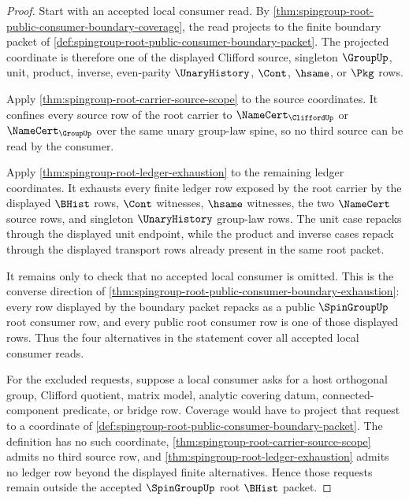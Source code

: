 \begin{proof}
Start with an accepted local consumer read. By \autoref{thm:spingroup-root-public-consumer-boundary-coverage}, the read projects to the finite boundary packet of \autoref{def:spingroup-root-public-consumer-boundary-packet}. The projected coordinate is therefore one of the displayed Clifford source, singleton $\GroupUp$, unit, product, inverse, even-parity $\UnaryHistory$, $\Cont$, $\hsame$, or $\Pkg$ rows.

Apply \autoref{thm:spingroup-root-carrier-source-scope} to the source coordinates. It confines every source row of the root carrier to $\NameCert_{\CliffordUp}$ or $\NameCert_{\GroupUp}$ over the same unary group-law spine, so no third source can be read by the consumer.

Apply \autoref{thm:spingroup-root-ledger-exhaustion} to the remaining ledger coordinates. It exhausts every finite ledger row exposed by the root carrier by the displayed $\BHist$ rows, $\Cont$ witnesses, $\hsame$ witnesses, the two $\NameCert$ source rows, and singleton $\UnaryHistory$ group-law rows. The unit case repacks through the displayed unit endpoint, while the product and inverse cases repack through the displayed transport rows already present in the same root packet.

It remains only to check that no accepted local consumer is omitted. This is the converse direction of \autoref{thm:spingroup-root-public-consumer-boundary-exhaustion}: every row displayed by the boundary packet repacks as a public $\SpinGroupUp$ root consumer row, and every public root consumer row is one of those displayed rows. Thus the four alternatives in the statement cover all accepted local consumer reads.

For the excluded requests, suppose a local consumer asks for a host orthogonal group, Clifford quotient, matrix model, analytic covering datum, connected-component predicate, or bridge row. Coverage would have to project that request to a coordinate of \autoref{def:spingroup-root-public-consumer-boundary-packet}. The definition has no such coordinate, \autoref{thm:spingroup-root-carrier-source-scope} admits no third source row, and \autoref{thm:spingroup-root-ledger-exhaustion} admits no ledger row beyond the displayed finite alternatives. Hence those requests remain outside the accepted $\SpinGroupUp$ root $\BHist$ packet.
\end{proof}
